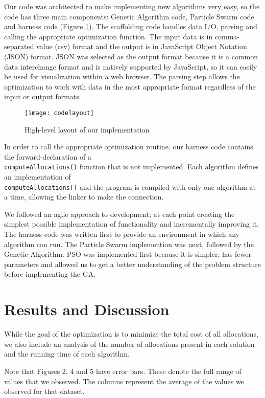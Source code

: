 \documentclass{sig-alternate}
\begin{document}
Our code was architected to make implementing new algorithms very easy, so the code has three main components: Genetic Algorithm code, Particle Swarm code and harness code (Figure \ref{fig:codelayout}). The scaffolding code handles data I/O, parsing and calling the appropriate optimization function. The input data is in comma-separated value (csv) format and the output is in JavaScript Object Notation (JSON) format. JSON was selected as the output format because it is a common data interchange format and is natively supported by JavaScript, so it can easily be used for visualization within a web browser. The parsing step allows the optimization to work with data in the most appropriate format regardless of the input or output formats.

\begin{figure}
	\centering
	\texttt{[image: codelayout]}
	\caption{High-level layout of our implementation}
	\label{fig:codelayout}
\end{figure}

In order to call the appropriate optimization routine, our harness code contains the forward-declaration of a \\\verb|computeAllocations()| function that is not implemented.
Each algorithm defines an implementation of \\\verb|computeAllocations()| and the program is compiled with only one algorithm at a time, allowing the linker to make the connection.

We followed an agile approach to development\cite{Cockburn2001}; at each point creating the simplest possible implementation of functionality and incrementally improving it. 
The harness code was written first to provide an environment in which any algorithm can run. The Particle Swarm implemention was next, followed by the Genetic Algorithm. PSO was implemented first because it is simpler, has fewer parameters and allowed us to get a better understanding of the problem structure before implementing the GA.

\section{Results and Discussion}\label{sec:results}
While the goal of the optimization is to minimize the total cost of all allocations, we also include an analysis of the number of allocations present in each solution and the running time of each algorithm.

Note that Figures 2, 4 and 5 have error bars. These denote the full range of values that we observed. The columns represent the average of the values we observed for that dataset.
\end{document}
